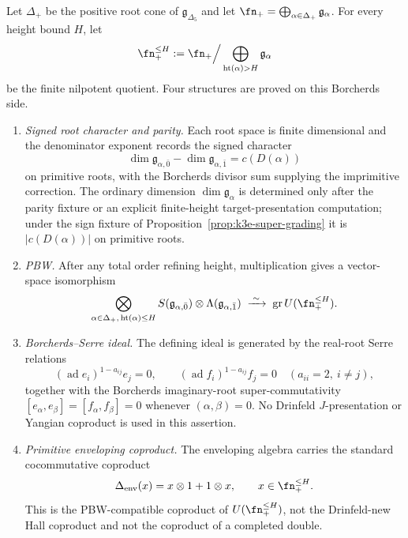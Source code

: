 \begin{theorem}
\label{thm:k3e-bkm-finite-core}
Let $\Delta_+$ be the positive root cone of $\mathfrak g_{\Delta_5}$ and
let $\fn_+ = \bigoplus_{\alpha\in\Delta_+}\mathfrak g_\alpha$. For every
height bound $H$, let
\[
 \fn_+^{\leq H}
 :=
 \fn_+\Big/\bigoplus_{\mathrm{ht}(\alpha)>H}\mathfrak g_\alpha
\]
be the finite nilpotent quotient. Four structures are proved on
this Borcherds side.
\begin{enumerate}[label=\textup{(\alph*)}]
\item \emph{Signed root character and parity.} Each root space is finite
dimensional and the denominator exponent records the signed character
\[
 \dim \mathfrak g_{\alpha,\bar 0}-\dim \mathfrak g_{\alpha,\bar 1}
 = c(D(\alpha))
\]
on primitive roots, with the Borcherds divisor sum supplying the
imprimitive correction. The ordinary dimension
\(\dim\mathfrak g_\alpha\) is determined only after the parity fixture
or an explicit finite-height target-presentation computation; under the
sign fixture of Proposition~\ref{prop:k3e-super-grading} it is
\(|c(D(\alpha))|\) on primitive roots.
\item \emph{PBW.} After any total order refining height, multiplication gives
a vector-space isomorphism
\[
 \bigotimes_{\alpha\in\Delta_+,\,\mathrm{ht}(\alpha)\leq H}
 S(\mathfrak g_{\alpha,\bar 0})
 \otimes
 \Lambda(\mathfrak g_{\alpha,\bar 1})
 \;\xrightarrow{\;\sim\;}\;
 \operatorname{gr} U(\fn_+^{\leq H}).
\]
\item \emph{Borcherds--Serre ideal.} The defining ideal is generated by the
real-root Serre relations
\[
 (\operatorname{ad} e_i)^{1-a_{ij}}e_j=0,\qquad
 (\operatorname{ad} f_i)^{1-a_{ij}}f_j=0
 \quad (a_{ii}=2,\ i\ne j),
\]
together with the Borcherds imaginary-root super-commutativity
$[e_\alpha,e_\beta]=[f_\alpha,f_\beta]=0$ whenever
$(\alpha,\beta)=0$. No Drinfeld $J$-presentation or Yangian coproduct is
used in this assertion.
\item \emph{Primitive enveloping coproduct.} The enveloping algebra carries
the standard cocommutative coproduct
\[
 \Delta_{\mathrm{env}}(x)=x\otimes 1+1\otimes x,\qquad x\in\fn_+^{\leq H}.
\]
This is the PBW-compatible coproduct of $U(\fn_+^{\leq H})$, not the
Drinfeld-new Hall coproduct and not the coproduct of a completed double.
\end{enumerate}
\end{theorem}

